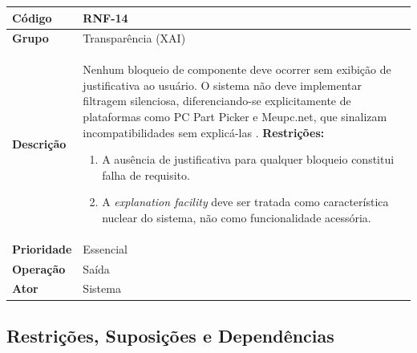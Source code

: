 \FloatBarrier
\begin{quadro}[htb]
  \caption{RNF-14 -- Ausência de bloqueios silenciosos}
  \label{quad:rnf14}
  \begin{tabular}{|p{3.2cm}|p{11.8cm}|}
    \hline
    \textbf{Código}     & RNF-14                                                                                                       \\ \hline
    \textbf{Grupo}      & Transparência (XAI)                                                                                          \\ \hline
    \textbf{Descrição}  &
    Nenhum bloqueio de componente deve ocorrer sem exibição de justificativa ao usuário. O sistema não deve implementar filtragem silenciosa, diferenciando-se explicitamente de plataformas como PC Part Picker e Meupc.net, que sinalizam incompatibilidades sem explicá-las \cite{Clancey1983}.
    \textbf{Restrições:}
    \begin{enumerate}[nosep,leftmargin=1.2em,topsep=2pt,partopsep=0pt,parsep=0pt,itemsep=1pt]
      \item A ausência de justificativa para qualquer bloqueio constitui falha de requisito.
      \item A \textit{explanation facility} deve ser tratada como característica nuclear do sistema, não como funcionalidade acessória.
    \end{enumerate} \\ \hline
    \textbf{Prioridade} & Essencial                                                                                                    \\ \hline
    \textbf{Operação}   & Saída                                                                                                        \\ \hline
    \textbf{Ator}       & Sistema                                                                                                      \\ \hline
  \end{tabular}
\end{quadro}

\subsection{Restrições, Suposições e Dependências}

